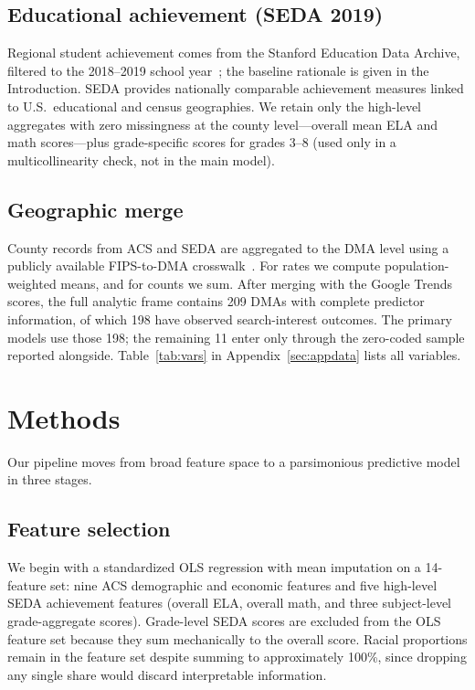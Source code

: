 \documentclass[11pt]{article}
\begin{document}
\subsection{Educational achievement (SEDA 2019)}

Regional student achievement comes from the Stanford Education Data Archive, filtered to the 2018--2019 school year~\citep{reardon2025}; the baseline rationale is given in the Introduction. SEDA provides nationally comparable achievement measures linked to U.S.\ educational and census geographies. We retain only the high-level aggregates with zero missingness at the county level---overall mean ELA and math scores---plus grade-specific scores for grades 3--8 (used only in a multicollinearity check, not in the main model).

\subsection{Geographic merge}

County records from ACS and SEDA are aggregated to the DMA level using a publicly available FIPS-to-DMA crosswalk~\citep{kapastor2020}. For rates we compute population-weighted means, and for counts we sum. After merging with the Google Trends scores, the full analytic frame contains 209 DMAs with complete predictor information, of which 198 have observed search-interest outcomes. The primary models use those 198; the remaining 11 enter only through the zero-coded sample reported alongside. Table~\ref{tab:vars} in Appendix~\ref{sec:appdata} lists all variables.

\section{Methods}

Our pipeline moves from broad feature space to a parsimonious predictive model in three stages.

\subsection{Feature selection}

We begin with a standardized OLS regression with mean imputation on a 14-feature set: nine ACS demographic and economic features and five high-level SEDA achievement features (overall ELA, overall math, and three subject-level grade-aggregate scores). Grade-level SEDA scores are excluded from the OLS feature set because they sum mechanically to the overall score. Racial proportions remain in the feature set despite summing to approximately 100\%, since dropping any single share would discard interpretable information.
\end{document}
